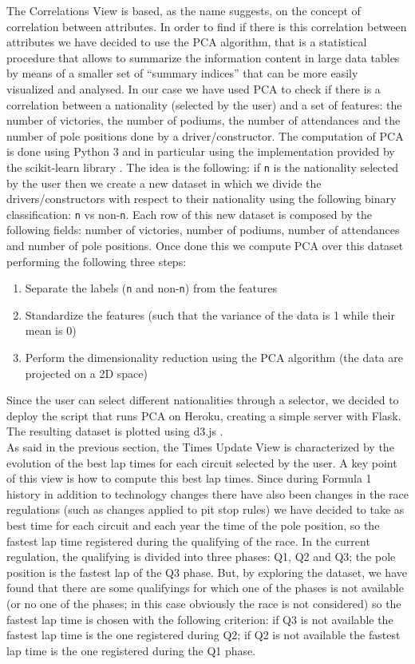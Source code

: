 \documentclass[11pt,twocolumn,letterpaper]{article}
\begin{document}
The Correlations View is based, as the name suggests, on the concept of correlation between attributes. In order to find if there is this correlation between attributes we have
decided to use the PCA algorithm, that is a statistical procedure that allows to summarize the information content in large data tables by means of a smaller set of “summary indices” 
that can be more easily visualized and analysed. In our case we have used PCA to check if there is a correlation between a nationality (selected by the user) and a set of features:
the number of victories, the number of podiums, the number of attendances and the number of pole positions done by a driver/constructor. The computation of PCA is done using Python 3 
and in particular using the implementation provided by the scikit-learn library \cite{Scikit-learn}. The idea is the following: if \texttt{n} is the nationality selected by the user 
then we create a new dataset in which we divide the drivers/constructors with respect to their nationality using the following binary classification: \texttt{n} vs non-\texttt{n}. 
Each row of this new dataset is composed by the following fields: number of victories, number of podiums, number of attendances and number of pole positions. Once done this we compute
PCA over this dataset performing the following three steps:
\begin{enumerate}
	\item Separate the labels (\texttt{n} and non-\texttt{n}) from the features
	\item Standardize the features (such that the variance of the data is 1 while their mean is 0)
	\item Perform the dimensionality reduction using the PCA algorithm (the data are projected on a 2D space)
\end{enumerate}
Since the user can select different nationalities through a selector, we decided to deploy the script that runs PCA on Heroku\cite{Heroku}, creating a simple server with Flask\cite{Flask}.
The resulting dataset is plotted using d3.js \cite{D3}.\\
As said in the previous section, the Times Update View is characterized by the evolution of the best lap times for each circuit selected by the user. A key point of this view is how to 
compute this best lap times. Since during Formula 1 history in addition to technology changes there have also been changes in the race regulations (such as changes applied to pit stop
rules) we have decided to take as best time for each circuit and each year the time of the pole position, so the fastest lap time registered during the qualifying of the race.
In the current regulation, the qualifying is divided into three phases: Q1, Q2 and Q3; the pole position is the fastest lap of the Q3 phase. But, by exploring the dataset, we have found
that there are some qualifyings for which one of the phases is not available (or no one of the phases; in this case obviously the race is not considered) so the fastest lap time is chosen
with the following criterion: if Q3 is not available the fastest lap time is the one registered during Q2; if Q2 is not available the fastest lap time is the one registered during
the Q1 phase.
\end{document}
